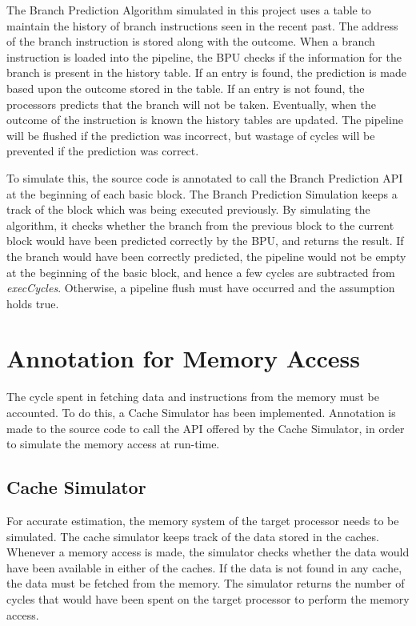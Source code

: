 The Branch Prediction Algorithm simulated in this project uses a table to maintain the history of branch instructions seen in the recent past. The address of the branch instruction is stored along with the outcome. When a branch instruction is loaded into the pipeline, the BPU checks if the information for the branch is present in the history table. If an entry is found, the prediction is made based upon the outcome stored in the table. If an entry is not found, the processors predicts that the branch will not be taken. Eventually, when the outcome of the instruction is known the history tables are updated. The pipeline will be flushed if the prediction was incorrect, but wastage of cycles will be prevented if the prediction was correct.

To simulate this, the source code is annotated to call the Branch Prediction API at the beginning of each basic block. The Branch Prediction Simulation keeps a track of the block which was being executed previously. By simulating the algorithm, it checks whether the branch from the previous block to the current block would have been predicted correctly by the BPU, and returns the result. If the branch would have been correctly predicted, the pipeline would not be empty at the beginning of the basic block, and hence a few cycles are subtracted from \emph{execCycles}. Otherwise, a pipeline flush must have occurred and the assumption holds true.

\section{Annotation for Memory Access}
The cycle spent in fetching data and instructions from the memory must be accounted. To do this, a Cache Simulator has been implemented. Annotation is made to the source code to call the API offered by the Cache Simulator, in order to simulate the memory access at run-time.

\subsection{Cache Simulator}
For accurate estimation, the memory system of the target processor needs to be simulated. The cache simulator keeps track of the data stored in the caches. Whenever a memory access is made, the simulator checks whether the data would have been available in either of the caches. If the data is not found in any cache, the data must be fetched from the memory. The simulator returns the number of cycles that would have been spent on the target processor to perform the memory access.

